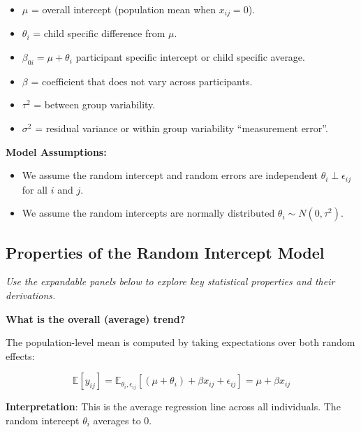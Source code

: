 \documentclass[
  letterpaper,
  DIV=11,
  numbers=noendperiod]{scrreprt}
\begin{document}
\begin{itemize}
\item
  \(\mu\) = overall intercept (population mean when \(x_{ij}=0\)).
\item
  \(\theta_i\) = child specific difference from \(\mu\).
\item
  \(\beta_{0i} = \mu + \theta_i\) participant specific intercept or
  child specific average.
\item
  \(\beta\) = coefficient that does not vary across participants.
\item
  \(\tau^2\) = between group variability.
\item
  \(\sigma^2\) = residual variance or within group variability
  ``measurement error''.
\end{itemize}

\textbf{Model Assumptions:}

\begin{itemize}
\item
  We assume the random intercept and random errors are independent
  \(\theta_i \perp \epsilon_{ij}\) for all \(i\) and \(j\).
\item
  We assume the random intercepts are normally distributed
  \(\theta_i \sim N(0, \tau^2)\).
\end{itemize}

\hypertarget{properties-of-the-random-intercept-model}{%
\subsection*{Properties of the Random Intercept
Model}\label{properties-of-the-random-intercept-model}}

\emph{Use the expandable panels below to explore key statistical
properties and their derivations.}

\begin{tcolorbox}[enhanced jigsaw, rightrule=.15mm, breakable, left=2mm, colframe=quarto-callout-tip-color-frame, opacityback=0, leftrule=.75mm, toprule=.15mm, colback=white, arc=.35mm, bottomrule=.15mm]

\textbf{What is the overall (average) trend?}\vspace{2mm}

The population-level mean is computed by taking expectations over both
random effects:

\[
\mathbb{E}[y_{ij}] = \mathbb{E}_{\theta_i, \epsilon_{ij}}[(\mu + \theta_i) + \beta x_{ij} + \epsilon_{ij}] = \mu + \beta x_{ij}
\]

\textbf{Interpretation}: This is the average regression line across all
individuals. The random intercept \(\theta_i\) averages to 0.

\end{tcolorbox}
\end{document}
